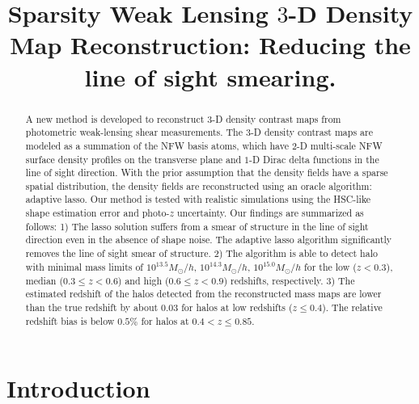 \documentclass[twocolumn]{aastex62}
\begin{document}
\title{Sparsity Weak Lensing $3$-D Density Map Reconstruction:
Reducing the line of sight smearing.}

\begin{abstract}
A new method is developed to reconstruct $3$-D density contrast maps from
photometric weak-lensing shear measurements. The $3$-D density contrast maps
are modeled as a summation of the NFW basis atoms, which have $2$-D multi-scale
NFW surface density profiles on the transverse plane and $1$-D Dirac delta
functions in the line of sight direction. With the prior assumption that the
density fields have a sparse spatial distribution, the density fields are
reconstructed using an oracle algorithm: adaptive lasso. Our method is tested
with realistic simulations using the HSC-like shape estimation error and
photo-$z$ uncertainty.  Our findings are summarized as follows: 1) The lasso
solution suffers from a smear of structure in the line of sight direction even
in the absence of shape noise. The adaptive lasso algorithm significantly
removes the line of sight smear of structure.  2) The algorithm is able to
detect halo with minimal mass limits of $10^{13.5} M_{\odot}/h$, $10^{14.3}
M_{\odot}/h$, $10^{15.0} M_{\odot}/h$ for the low ($z<0.3$), median ($0.3\leq
z< 0.6$) and high ($0.6\leq z< 0.9$) redshifts, respectively.  3) The estimated
redshift of the halos detected from the reconstructed mass maps are lower than
the true redshift by about $0.03$ for halos at low redshifts ($z\leq 0.4$). The
relative redshift bias is below $0.5\%$ for halos at $0.4<z\leq 0.85$.
\end{abstract}

\section{Introduction}
\end{document}
